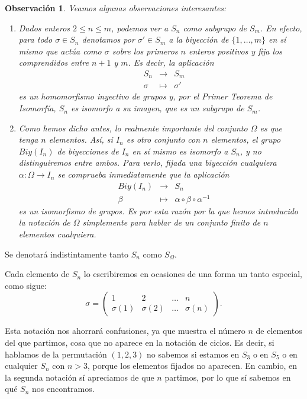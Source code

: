 \documentclass[12pt]{article}
\newtheorem{observation}{Observación}[theorem]
\begin{document}
\begin{observation}\label{eq:obsabel} Veamos algunas observaciones interesantes:
\begin{enumerate}
\item Dados enteros $2 \leq n \leq m$, podemos ver a $S_{n}$ como subgrupo de $S_{m}$. En efecto, para todo $\sigma \in S_{n}$ denotamos por $\sigma' \in S_{m}$ a la biyección de $\lbrace 1, \ldots, m \rbrace$ en sí mismo que actúa como $\sigma$ sobre los primeros $n$ enteros positivos y fija los comprendidos entre $n+1$ y $m$. Es decir, la aplicación $$\begin{array}{rccl}
&S_{n}& \longrightarrow &S_{m}\\
&\sigma& \longmapsto &\sigma'
\end{array}
$$ es un homomorfismo inyectivo de grupos y, por el \textit{Primer Teorema de Isomorfía}, $S_{n}$ es isomorfo a su imagen, que es un subgrupo de $S_{m}$.
\item Como hemos dicho antes, lo realmente importante del conjunto $\Omega$ es que tenga $n$ elementos. Así, si $I_{n}$ es otro conjunto con $n$ elementos, el grupo $Biy(I_{n})$ de biyecciones de $I_{n}$ en sí mismo es isomorfo a $S_{n}$, y no distinguiremos entre ambos. Para verlo, fijada una biyección cualquiera $\alpha \colon \Omega \longrightarrow I_{n}$ se comprueba inmediatamente que la aplicación  $$\begin{array}{rccl}
&Biy(I_{n})& \longrightarrow &S_{n}\\
&\beta& \longmapsto &\alpha\circ \beta \circ \alpha^{-1}
\end{array}
$$ es un isomorfismo de grupos. Es por esta razón por la que hemos introducido la notación de $\Omega$ simplemente para hablar de un conjunto finito de $n$ elementos cualquiera.
\end{enumerate}
\end{observation}

Se denotará indistintamente tanto $S_n$ como $S_\Omega$.

Cada elemento de $S_n$ lo escribiremos en ocasiones de una forma un tanto especial, como sigue: 
$$\sigma = \left(
\begin{matrix}
1 & 2 & \ldots & n \\
\sigma(1) & \sigma(2) & \ldots & \sigma(n)
\end{matrix}
\right).
$$

Esta notación nos ahorrará confusiones, ya que muestra el número $n$ de elementos del que partimos, cosa que no aparece en la notación de ciclos. Es decir, si hablamos de la permutación $(1,2,3)$ no sabemos si estamos en $S_3$ o en $S_5$ o en cualquier $S_n$ con $n>3$, porque los elementos fijados no aparecen. En cambio, en la segunda notación sí apreciamos de que $n$ partimos, por lo que sí sabemos en qué $S_n$ nos encontramos.
\end{document}
